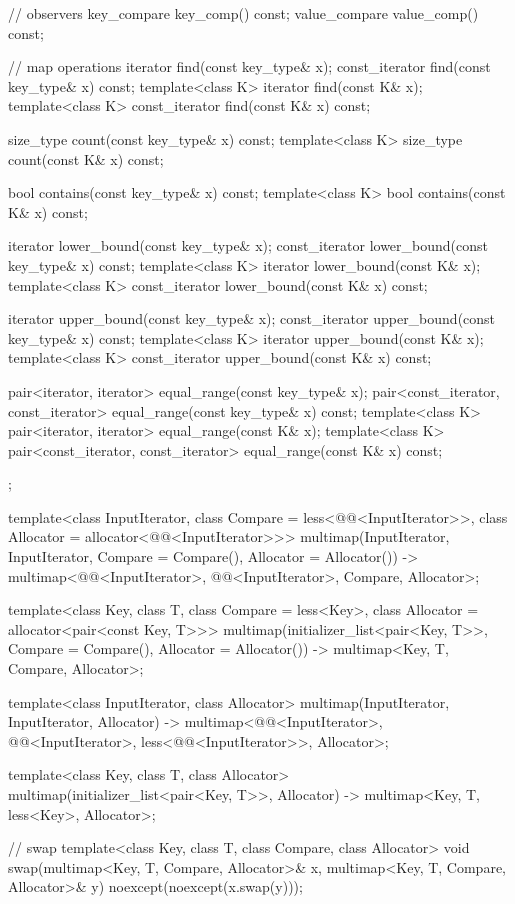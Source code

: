 \begin{codeblock}
{{    // observers
    key_compare key_comp() const;
    value_compare value_comp() const;

    // map operations
    iterator       find(const key_type& x);
    const_iterator find(const key_type& x) const;
    template<class K> iterator       find(const K& x);
    template<class K> const_iterator find(const K& x) const;

    size_type      count(const key_type& x) const;
    template<class K> size_type count(const K& x) const;

    bool           contains(const key_type& x) const;
    template<class K> bool contains(const K& x) const;

    iterator       lower_bound(const key_type& x);
    const_iterator lower_bound(const key_type& x) const;
    template<class K> iterator       lower_bound(const K& x);
    template<class K> const_iterator lower_bound(const K& x) const;

    iterator       upper_bound(const key_type& x);
    const_iterator upper_bound(const key_type& x) const;
    template<class K> iterator       upper_bound(const K& x);
    template<class K> const_iterator upper_bound(const K& x) const;

    pair<iterator, iterator>               equal_range(const key_type& x);
    pair<const_iterator, const_iterator>   equal_range(const key_type& x) const;
    template<class K>
      pair<iterator, iterator>             equal_range(const K& x);
    template<class K>
      pair<const_iterator, const_iterator> equal_range(const K& x) const;
  };

  template<class InputIterator, class Compare = less<@@<InputIterator>>,
           class Allocator = allocator<@@<InputIterator>>>
    multimap(InputIterator, InputIterator, Compare = Compare(), Allocator = Allocator())
      -> multimap<@@<InputIterator>, @@<InputIterator>,
                  Compare, Allocator>;

  template<class Key, class T, class Compare = less<Key>,
           class Allocator = allocator<pair<const Key, T>>>
    multimap(initializer_list<pair<Key, T>>, Compare = Compare(), Allocator = Allocator())
      -> multimap<Key, T, Compare, Allocator>;

  template<class InputIterator, class Allocator>
    multimap(InputIterator, InputIterator, Allocator)
      -> multimap<@@<InputIterator>, @@<InputIterator>,
                  less<@@<InputIterator>>, Allocator>;

  template<class Key, class T, class Allocator>
    multimap(initializer_list<pair<Key, T>>, Allocator)
      -> multimap<Key, T, less<Key>, Allocator>;

  // swap
  template<class Key, class T, class Compare, class Allocator>
    void swap(multimap<Key, T, Compare, Allocator>& x,
              multimap<Key, T, Compare, Allocator>& y)
      noexcept(noexcept(x.swap(y)));
}
\end{codeblock}%
%

